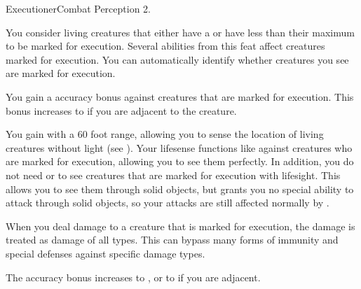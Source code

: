     \begin{feat}{Executioner}{Combat}
        \featpres Perception 2.

         You consider living creatures that either have a  or have less than their maximum  to be marked for execution.
        Several abilities from this feat affect creatures marked for execution.
        You can automatically identify whether creatures you see are marked for execution.

         You gain a  accuracy bonus against creatures that are marked for execution.
        This bonus increases to  if you are adjacent to the creature.

         You gain  with a 60 foot range, allowing you to sense the location of living creatures without light (see ).
        Your lifesense functions like  against creatures who are marked for execution, allowing you to see them perfectly.
        In addition, you do not need  or  to see creatures that are marked for execution with lifesight.
        This allows you to see them through solid objects, but grants you no special ability to attack through solid objects, so your attacks are still affected normally by .

         When you deal damage to a creature that is marked for execution, the damage is treated as damage of all types.
        This can bypass many forms of immunity and special defenses against specific damage types.

         The accuracy bonus increases to , or to  if you are adjacent.
    \end{feat}

